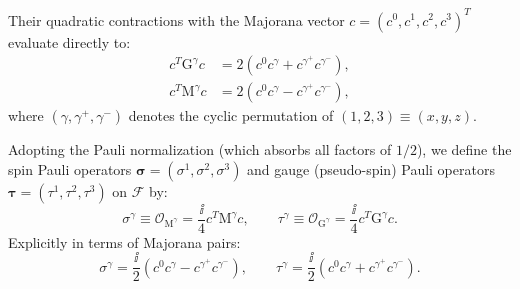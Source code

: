 Their quadratic contractions with the Majorana vector $c = (c^0, c^1, c^2, c^3)^T$ evaluate directly to:
\begin{align}
\label{eq:m1_1_G_contraction}
c^T \mathrm{G}^\gamma c &= 2(c^0 c^\gamma + c^{\gamma^+} c^{\gamma^-}), \\
\label{eq:m1_1_M_contraction}
c^T \mathrm{M}^\gamma c &= 2(c^0 c^\gamma - c^{\gamma^+} c^{\gamma^-}),
\end{align}
where $(\gamma, \gamma^+, \gamma^-)$ denotes the cyclic permutation of $(1, 2, 3) \equiv (x, y, z)$.

\begin{definition}
\label{def:m1_1_spin_gauge_pauli}
Adopting the Pauli normalization (which absorbs all factors of $1/2$), we define the spin Pauli operators $\bm{\sigma} = (\sigma^1, \sigma^2, \sigma^3)$ and gauge (pseudo-spin) Pauli operators $\bm{\tau} = (\tau^1, \tau^2, \tau^3)$ on $\mathcal{F}$ by:
\begin{equation}
\label{eq:m1_1_spin_gauge_pauli_def}
\sigma^\gamma \equiv \mathcal{O}_{\mathrm{M}^\gamma} = \frac{\ii}{4} c^T \mathrm{M}^\gamma c, \qquad \tau^\gamma \equiv \mathcal{O}_{\mathrm{G}^\gamma} = \frac{\ii}{4} c^T \mathrm{G}^\gamma c.
\end{equation}
Explicitly in terms of Majorana pairs:
\begin{equation}
\label{eq:m1_1_sigma_tau_explicit}
\sigma^\gamma = \frac{\ii}{2}(c^0 c^\gamma - c^{\gamma^+} c^{\gamma^-}), \qquad \tau^\gamma = \frac{\ii}{2}(c^0 c^\gamma + c^{\gamma^+} c^{\gamma^-}).
\end{equation}
\end{definition}

